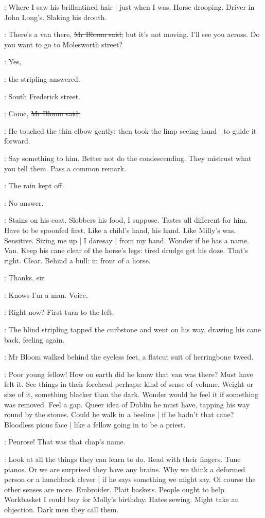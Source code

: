 \BloomInt:
Where I saw his brillantined hair |
just when I was.
Horse drooping.
Driver in John Long's.
Slaking his drouth.

\Bloom:
There's a van there,
\sout{Mr Bloom said,}
but it's not moving.
I'll see you across.
Do you want to go to Molesworth street?

\stripling:
Yes,

:
the stripling answered.

\stripling:
South Frederick street.

\Bloom:
Come,
\sout{Mr Bloom said.}

:
He touched the thin elbow gently:
then took the limp seeing hand |
to guide it forward.

\BloomInt:
Say something to him.
Better not do the condescending.
They mistrust what you tell them.
Pass a common remark.

\Bloom:
The rain kept off.

\BloomInt:
No answer.

\BloomInt:
Stains on his coat.
Slobbers his food, I suppose.
Tastes all different for him.
Have to be spoonfed first.
Like a child's hand, his hand.
Like Milly's was.
Sensitive.
Sizing me up |
I daresay |
from my hand.
Wonder if he has a name.
Van.
Keep his cane clear of the horse's legs:
tired drudge get his doze.
That's right.
Clear.
Behind a bull:
in front of a horse.

\stripling:
Thanks, sir.

\BloomInt:
Knows I'm a man.
Voice.

\Bloom:
Right now?
First turn to the left.

:
The blind stripling tapped the curbstone and went on his way,
drawing his cane back,
feeling again.

:
Mr Bloom walked behind the eyeless feet,
a flatcut suit of herringbone tweed.

\BloomInt:
Poor young fellow!
How on earth did he know that van was there?
Must have felt it.
See things in their forehead perhaps:
kind of sense of volume.
Weight or size of it,
something blacker than the dark.
Wonder would he feel it
if something was removed.
Feel a gap.
Queer idea of Dublin he must have,
tapping his way round by the stones.
Could he walk in a beeline |
if he hadn't that cane?
Bloodless pious face |
like a fellow going in to be a priest.

\BloomInt:
Penrose!
That was that chap's name.

\BloomInt:
Look at all the things they can learn to do.
Read with their fingers.
Tune pianos.
Or we are surprised they have any brains.
Why we think a deformed person or a hunchback clever |
if he says something we might say.
Of course the other senses are more.
Embroider.
Plait baskets.
People ought to help.
Workbasket I could buy for Molly's birthday.
Hates sewing.
Might take an objection.
Dark men they call them.

